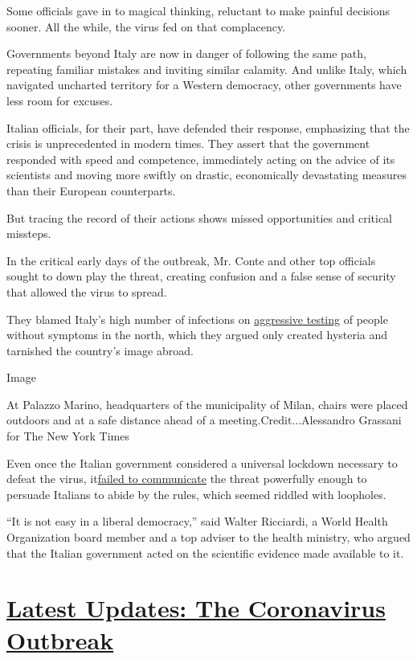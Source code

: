 Some officials gave in to magical thinking, reluctant to make painful
decisions sooner. All the while, the virus fed on that complacency.

Governments beyond Italy are now in danger of following the same path,
repeating familiar mistakes and inviting similar calamity. And unlike
Italy, which navigated uncharted territory for a Western democracy,
other governments have less room for excuses.

Italian officials, for their part, have defended their response,
emphasizing that the crisis is unprecedented in modern times. They
assert that the government responded with speed and competence,
immediately acting on the advice of its scientists and moving more
swiftly on drastic, economically devastating measures than their
European counterparts.

But tracing the record of their actions shows missed opportunities and
critical missteps.

In the critical early days of the outbreak, Mr. Conte and other top
officials sought to down play the threat, creating confusion and a false
sense of security that allowed the virus to spread.

They blamed Italy's high number of infections on
\href{https://www.nytimes3xbfgragh.onion/2020/02/27/world/europe/italy-coronavirus.html?searchResultPosition=35}{aggressive
testing} of people without symptoms in the north, which they argued only
created hysteria and tarnished the country's image abroad.

Image

At Palazzo Marino, headquarters of the municipality of Milan, chairs
were placed outdoors and at a safe distance ahead of a
meeting.Credit...Alessandro Grassani for The New York Times

Even once the Italian government considered a universal lockdown
necessary to defeat the virus,
it\href{https://www.nytimes3xbfgragh.onion/2020/03/08/world/europe/italy-coronavirus-quarantine.html?searchResultPosition=26}{failed
to communicate} the threat powerfully enough to persuade Italians to
abide by the rules, which seemed riddled with loopholes.

``It is not easy in a liberal democracy,'' said Walter Ricciardi, a
World Health Organization board member and a top adviser to the health
ministry, who argued that the Italian government acted on the scientific
evidence made available to it.

\hypertarget{latest-updates-the-coronavirus-outbreak}{%
\section{\texorpdfstring{\href{https://www.nytimes3xbfgragh.onion/2020/09/04/world/covid-19-coronavirus.html?action=click\&pgtype=Article\&state=default\&region=MAIN_CONTENT_1\&context=storylines_live_updates}{Latest
Updates: The Coronavirus
Outbreak}}{Latest Updates: The Coronavirus Outbreak}}\label{latest-updates-the-coronavirus-outbreak}}

